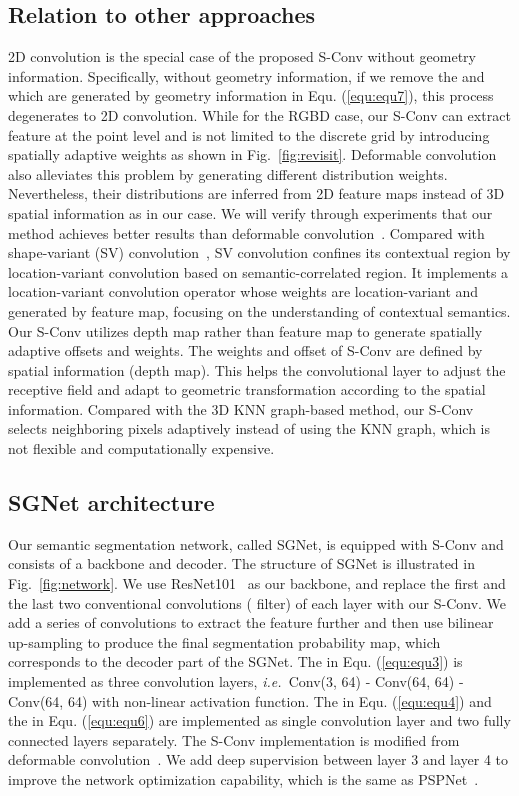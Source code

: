 \documentclass[journal]{IEEEtran}
\newcommand{\figref}[1]{Fig.~\ref{#1}}
\newcommand{\equref}[1]{Equ. (\ref{#1})}
\def\ie{\emph{i.e.~}}
\begin{document}
\subsection{Relation to other approaches}
2D convolution is the special case of the proposed
S-Conv without geometry information.
Specifically, without geometry information, if we remove the  and  which are generated by geometry
information in \equref{equ:equ7}, this process degenerates to 2D convolution.
While for the RGBD case, our S-Conv can extract feature at 
the point level and is not limited to the discrete grid by 
introducing spatially adaptive weights as shown in \figref{fig:revisit}. 
Deformable convolution~\cite{deform, deformablev2} also alleviates
this problem by generating different distribution weights.
Nevertheless, their distributions are inferred from 2D feature maps instead
of 3D spatial information as in our case.
We will verify through experiments that our method achieves
better results than deformable convolution~\cite{deform, deformablev2}.
Compared with shape-variant (SV) convolution~\cite{svconv},
SV convolution confines its contextual region by 
location-variant convolution based on semantic-correlated region. It 
implements a location-variant convolution operator whose weights 
are location-variant and generated by feature map, 
focusing on the understanding of contextual semantics. 
Our S-Conv utilizes depth map rather than feature map 
to generate spatially adaptive offsets and weights.
The weights and offset of S-Conv are defined by spatial information (depth map). This
helps the convolutional layer to adjust the receptive field and adapt 
to geometric transformation according to the spatial information.
Compared with the 3D KNN graph-based method, our S-Conv
selects neighboring pixels adaptively instead of using the KNN graph,
which is not flexible and computationally expensive.
\subsection{SGNet architecture}
Our semantic segmentation network, called SGNet, is equipped with S-Conv
and consists of a backbone and decoder.
The structure of SGNet is illustrated in \figref{fig:network}.
We use ResNet101~\cite{resnet} as our backbone,
and replace the first and the last two conventional convolutions 
( filter)
of each layer with our S-Conv.
We add a series of convolutions to extract the feature further
and then use bilinear up-sampling to produce the final segmentation
probability map, which corresponds to the decoder part of the SGNet.
The  in \equref{equ:equ3} is implemented as three
 convolution layers, 
\ie Conv(3, 64) - Conv(64, 64) - Conv(64, 64) with 
non-linear activation function.
The  in \equref{equ:equ4} and the  in \equref{equ:equ6}
are implemented as single convolution layer and two fully connected
layers separately. 
The S-Conv implementation is modified from deformable convolution~\cite{deformablev2,deform}.
We add deep supervision between layer 3 and layer 4 to improve
the network optimization capability, which is the same as PSPNet~\cite{psp}.
\end{document}
